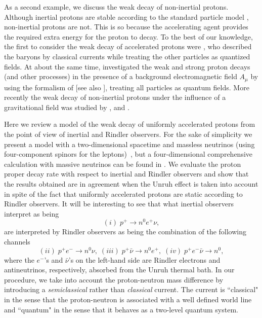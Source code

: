 \documentclass[12pt,nofootinbib,floatfix,aps,prd,showpacs,amsmath,amssymb,eqsecnum]{revtex4-2}
\begin{document}
As a second example, we discuss the weak decay of non-inertial protons. 
Although inertial protons are stable according to the standard 
particle model \cite{PDG}, non-inertial protons are not. This is so because 
the accelerating agent provides the required extra energy for 
the proton to decay. To the best of our knowledge, the first 
to consider the weak decay of accelerated protons were 
\textcite{Ginzburgetal64}, who described the baryons by classical 
currents while treating the other particles as quantized fields. 
At about the same 
time, \textcite{Zharkov65} investigated the weak and strong proton decays 
(and other processes) in the presence of a background electromagnetic field 
$A_\mu$ by using the formalism of 
\textcite{Nikishovetal64,Nikishovetal64b} 
[see also \textcite{Ritus69}], treating all particles as quantum fields.
More recently the weak decay of non-inertial protons under 
the influence of 
a gravitational field was studied by \textcite{Mueller97}, 
\textcite{Vanzellaetal00} and \textcite{Fregolenteetal06}.

Here we review a model of 
the weak decay of uniformly accelerated protons 
from the point of view of inertial and Rindler observers. For the sake 
of simplicity we present a model with 
a two-dimensional spacetime and massless 
neutrinos (using four-component spinors for the 
leptons)~\cite{Vanzellaetal01, Matsasetal99}, but a four-dimensional 
comprehensive calculation with massive neutrinos can be found in 
\textcite{Suzukietal03}. We evaluate the proton proper decay rate with 
respect to inertial and Rindler observers  and show that the results 
obtained are in agreement when the Unruh effect is taken into account 
in spite of the fact that uniformly accelerated protons are static 
according to Rindler observers. It will be interesting to see that 
what inertial observers interpret as being
$$
(i)\; p^+ \to n^0 e^+ \nu,
$$
are interpreted by Rindler observers as being the combination
of the following channels
$$
(ii)\;  p^+ e^- \to  n^0 \nu,\;
(iii)\; p^+ \bar\nu \to  n^0 e^+,\;
(iv)\;  p^+ e^- \bar\nu \to  n^0,
$$
where the $e^-$'s and $\bar \nu$'s on
the left-hand side are Rindler electrons 
and antineutrinos, respectively, absorbed from the Unruh thermal bath.
In our procedure, we take into account the proton-neutron mass difference
by introducing a {\em semiclassical} rather than {\em classical} current.
The current is ``classical" in the sense that the proton-neutron is associated 
with a well defined world line and ``quantum" in the sense that it behaves 
as a two-level quantum system.
\end{document}

